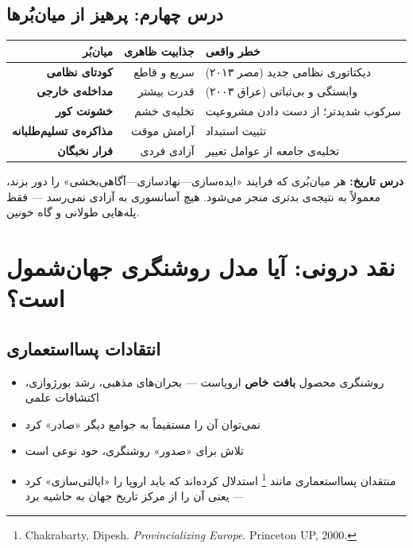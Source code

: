 \subsection{درس چهارم: پرهیز از میان‌بُرها}

\begin{tcolorbox}[failbox, title={میان‌بُرهای خطرناک}]
\begin{table}[H]
\centering
\begin{tabularx}{\textwidth}{r|r|X}
\toprule
\textbf{میان‌بُر} & \textbf{جذابیت ظاهری} & \textbf{خطر واقعی} \\
\midrule
\textbf{کودتای نظامی} & سریع و قاطع & دیکتاتوری نظامی جدید
  (مصر ۲۰۱۳) \\
\textbf{مداخله‌ی خارجی} & قدرت بیشتر & وابستگی و بی‌ثباتی
  (عراق ۲۰۰۳) \\
\textbf{خشونت کور} & تخلیه‌ی خشم & سرکوب شدیدتر؛ از دست دادن مشروعیت \\
\textbf{مذاکره‌ی تسلیم‌طلبانه} & آرامش موقت & تثبیت استبداد \\
\textbf{فرار نخبگان} & آزادی فردی & تخلیه‌ی جامعه از عوامل تغییر \\
\bottomrule
\end{tabularx}
\end{table}

\textbf{درس تاریخ:} هر میان‌بُری که فرایند
«ایده‌سازی—نهادسازی—آگاهی‌بخشی» را دور بزند، معمولاً به نتیجه‌ی بدتری
منجر می‌شود. هیچ آسانسوری به آزادی نمی‌رسد — فقط پله‌هایی طولانی و گاه
خونین.
\end{tcolorbox}


\section{نقد درونی: آیا مدل روشنگری جهان‌شمول است؟}
\label{sec:ch16-internal-critique}

\subsection{انتقادات پسااستعماری}

\begin{tcolorbox}[enemybox, title={نقد ۱: اروپامحوری}]
\begin{itemize}
\item روشنگری محصول \textbf{بافت خاص} اروپاست — بحران‌های مذهبی، رشد
  بورژوازی، اکتشافات علمی
\item نمی‌توان آن را مستقیماً به جوامع دیگر «صادر» کرد
\item تلاش برای «صدور» روشنگری، خود نوعی  است
\item منتقدان پسااستعماری مانند \footnote{%
  Chakrabarty, Dipesh. \textit{Provincializing Europe}. Princeton UP, 2000.}
  استدلال کرده‌اند که باید اروپا را «ایالتی‌سازی» کرد — یعنی آن را از
  مرکز تاریخ جهان به حاشیه برد
\end{itemize}
\end{tcolorbox}

